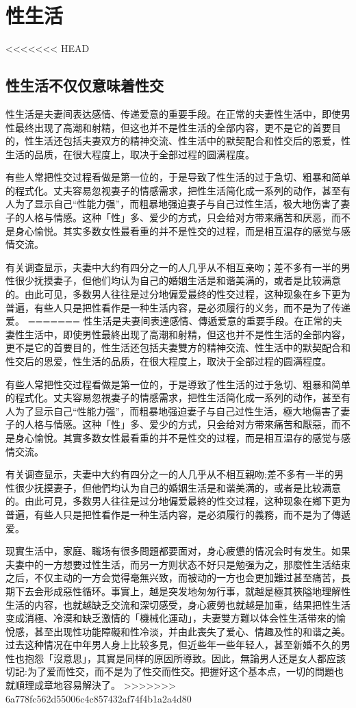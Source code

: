 \documentclass[12pt,UTF8]{ctexbook}
\begin{document}
\part{性生活}

<<<<<<< HEAD
\chapter{性生活不仅仅意味着性交}

性生活是夫妻间表达感情、传递爱意的重要手段。在正常的夫妻性生活中，即使男性最终出现了高潮和射精，但这也并不是性生活的全部内容，更不是它的首要目的，性生活还包括夫妻双方的精神交流、性生活中的默契配合和性交后的恩爱，性生活的品质，在很大程度上，取决于全部过程的圆满程度。

有些人常把性交过程看做是第一位的，于是导致了性生活的过于急切、粗暴和简单的程式化。丈夫容易忽视妻子的情感需求，把性生活简化成一系列的动作，甚至有人为了显示自己“性能力强”，而粗暴地强迫妻子与自己过性生活，极大地伤害了妻子的人格与情感。这种「性」多、爱少的方式，只会给对方带来痛苦和厌恶，而不是身心愉悦。其实多数女性最看重的并不是性交的过程，而是相互温存的感觉与感情交流。

有关调查显示，夫妻中大约有四分之一的人几乎从不相互亲吻；差不多有一半的男性很少抚摸妻子，但他们均认为自己的婚姻生活是和谐美满的，或者是比较满意的。由此可见，多数男人往往是过分地偏爱最终的性交过程，这种现象在乡下更为普遍，有些人只是把性看作是一种生活内容，是必须履行的义务，而不是为了传递爱。
=======
性生活是夫妻间表達感情、傳遞爱意的重要手段。在正常的夫妻性生活中，即使男性最終出现了高潮和射精，但这也并不是性生活的全部内容，更不是它的首要目的，性生活还包括夫妻雙方的精神交流、性生活中的默契配合和性交后的恩爱，性生活的品质，在很大程度上，取決于全部过程的圆满程度。

有些人常把性交过程看做是第一位的，于是導致了性生活的过于急切、粗暴和简单的程式化。丈夫容易忽視妻子的情感需求，把性生活简化成一系列的动作，甚至有人为了显示自己“性能力强”，而粗暴地强迫妻子与自己过性生活，極大地傷害了妻子的人格与情感。这种「性」多、爱少的方式，只会给对方带來痛苦和厭惡，而不是身心愉悅。其實多数女性最看重的并不是性交的过程，而是相互温存的感觉与感情交流。

有关调查显示，夫妻中大约有四分之一的人几乎从不相互親吻;差不多有一半的男性很少抚摸妻子，但他們均认为自己的婚姻生活是和谐美满的，或者是比较满意的。由此可見，多数男人往往是过分地偏爱最終的性交过程，这种现象在鄉下更为普遍，有些人只是把性看作是一种生活内容，是必須履行的義務，而不是为了傳遞爱。

现實生活中，家庭、職场有很多問題都要面对，身心疲憊的情况会时有发生。如果夫妻中的一方想要过性生活，而另一方则状态不好只是勉强为之，那麼性生活结束之后，不仅主动的一方会觉得毫無兴致，而被动的一方也会更加難过甚至痛苦，長期下去会形成惡性循环。事實上，越是突发地匆匆行事，就越是極其狹隘地理解性生活的内容，也就越缺乏交流和深切感受，身心疲勞也就越是加重，结果把性生活变成消極、冷漠和缺乏激情的「機械化運动」，夫妻雙方難以体会性生活带來的愉悅感，甚至出现性功能障礙和性冷淡，并由此喪失了爱心、情趣及性的和谐之美。过去这种情况在中年男人身上比较多見，但近些年一些年轻人，甚至新婚不久的男性也抱怨「沒意思」，其實是同样的原因所導致。因此，無論男人还是女人都应該切記:为了爱而性交，而不是为了性交而性交。把握好这个基本点，一切的問題也就順理成章地容易解決了。
>>>>>>> 6a778fc562d55006c4c857432af74f4b1a2a4d80
\end{document}
